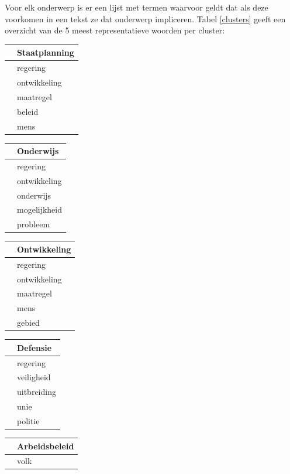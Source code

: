 Voor elk onderwerp is er een lijst met termen waarvoor geldt dat als deze voorkomen in een tekst ze dat onderwerp impliceren. Tabel \ref{clusters} geeft een overzicht van de 5 meest representatieve woorden per cluster:
\begin{table}[H]
\centering
\begin{tabular}{ll}
\toprule
{} &             \textbf{Staatplanning} \\
\midrule
 &      regering \\
 &  ontwikkeling \\
 &     maatregel \\
 &        beleid \\
 &          mens \\
\bottomrule
\end{tabular}
\begin{tabular}{ll}
\toprule
{} &             \textbf{Onderwijs} \\
\midrule
 &  regering \\
 &     ontwikkeling \\
 &       onderwijs \\
 &  mogelijkheid \\
 &      probleem \\
\bottomrule
\end{tabular}
\begin{tabular}{ll}
\toprule
{} &             \textbf{Ontwikkeling} \\
\midrule
 &      regering \\
 &  ontwikkeling \\
 &     maatregel \\
 &          mens \\
 &        gebied \\
\bottomrule
\end{tabular}
\begin{tabular}{ll}
\toprule
{} &            \textbf{Defensie} \\
\midrule
 &     regering \\
 &   veiligheid \\
 &  uitbreiding \\
 &         unie \\
 &      politie \\
\bottomrule
\end{tabular}
\begin{tabular}{ll}
\toprule
{} &                \textbf{Arbeidsbeleid} \\
\midrule
 &             volk \\

\end{tabular}
\end{table}
